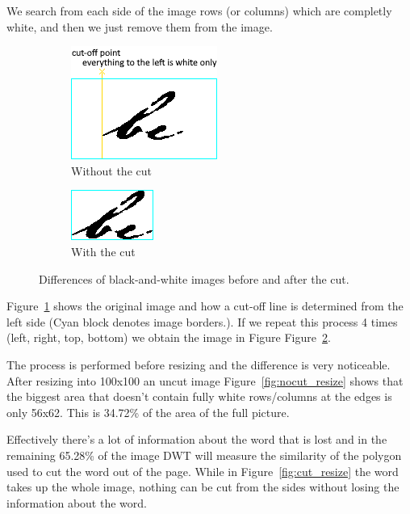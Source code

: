 \documentclass[12pt]{article}
\begin{document}
We search from each side of the image rows (or columns) which are completly white, and then we just remove them from the image.

\begin{figure}
     \centering
     \begin{subfigure}[b]{0.3\textwidth}
         \centering
         \includegraphics[scale=1.0]{figs/grey_nocut.png}
         \caption{Without the cut}
         \label{fig:grey_nocut}
     \end{subfigure}
     \begin{subfigure}[b]{0.3\textwidth}
         \centering
         \includegraphics[scale=1.0]{figs/grey_cut.png}
         \caption{With the cut}
         \label{fig:grey_cut}
     \end{subfigure}
        \caption{Differences of black-and-white images before and after the cut.}
        \label{fig:orig_grey}
\end{figure}

Figure~\ref{fig:grey_nocut} shows the original image and how a cut-off line is determined from the left side (Cyan block denotes image borders.). If we repeat this process 4 times (left, right, top, bottom) we obtain the image in Figure Figure~\ref{fig:grey_cut}.

The process is performed before resizing and the difference is very noticeable. After resizing into 100x100 an uncut image Figure~\ref{fig:nocut_resize} shows that the biggest area that doesn't contain fully white rows/columns at the edges is only 56x62. This is 34.72\% of the area of the full picture.

Effectively there's a lot of information about the word that is lost and in the remaining 65.28\% of the image DWT will measure the similarity of the polygon used to cut the word out of the page. While in Figure~\ref{fig:cut_resize} the word takes up the whole image, nothing can be cut from the sides without losing the information about the word.
\end{document}
